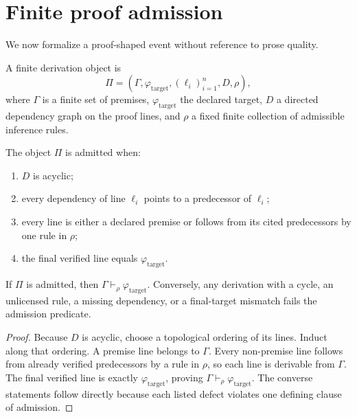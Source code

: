 \section{Finite proof admission}

We now formalize a proof-shaped event without reference to prose quality.

\begin{definition}
A finite derivation object is
\begin{equation}
\Pi=(\Gamma,\varphi_{\mathrm{target}},(\ell_i)_{i=1}^n,D,\rho),
\label{eq:proof-object}
\end{equation}
where $\Gamma$ is a finite set of premises, $\varphi_{\mathrm{target}}$ the declared target, $D$ a directed dependency graph on the proof lines, and $\rho$ a fixed finite collection of admissible inference rules.
\end{definition}

\begin{definition}
The object $\Pi$ is admitted when:
\begin{enumerate}[label=(\roman*)]
\item $D$ is acyclic;
\item every dependency of line $\ell_i$ points to a predecessor of $\ell_i$;
\item every line is either a declared premise or follows from its cited predecessors by one rule in $\rho$;
\item the final verified line equals $\varphi_{\mathrm{target}}$.
\end{enumerate}
\end{definition}

\begin{theorem}
If $\Pi$ is admitted, then $\Gamma\vdash_{\rho}\varphi_{\mathrm{target}}$. Conversely, any derivation with a cycle, an unlicensed rule, a missing dependency, or a final-target mismatch fails the admission predicate.
\end{theorem}

\begin{proof}
Because $D$ is acyclic, choose a topological ordering of its lines. Induct along that ordering. A premise line belongs to $\Gamma$. Every non-premise line follows from already verified predecessors by a rule in $\rho$, so each line is derivable from $\Gamma$. The final verified line is exactly $\varphi_{\mathrm{target}}$, proving $\Gamma\vdash_{\rho}\varphi_{\mathrm{target}}$. The converse statements follow directly because each listed defect violates one defining clause of admission.
\end{proof}

